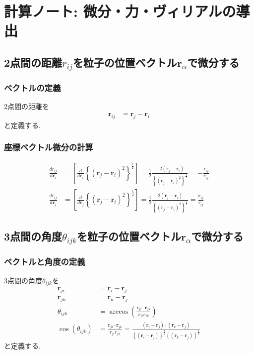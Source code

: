 \clearpage
\section{計算ノート: 微分・力・ヴィリアルの導出}
\subsection{2点間の距離$r_{ij}$を粒子の位置ベクトル$\bm{r}_{\alpha}$で微分する}
\subsubsection{ベクトルの定義}
2点間の距離を
\begin{align}
   \bm{r}_{ij}
&= \bm{r}_{j} - \bm{r}_{i}
\end{align}
と定義する.

\subsubsection{座標ベクトル微分の計算}
\begin{align}
\frac{d r_{ij}}{d \bm{r}_{i}}
&=
\left[
   \frac{d}{d \bm{r}_{i}}
   \left\{ (\bm{r}_{j} - \bm{r}_{i} )^{2} \right\}^{\frac{1}{2}}
\right]
=
\frac{1}{2}
\frac{ -2 (\bm{r}_{j} - \bm{r}_{i}) }
     { \left\{ ( \bm{r}_{j} - \bm{r}_{i} )^{2} \right\}^{\frac{1}{2}} }
=
-
\frac{\bm{r}_{ij}}{r_{ij}}
\label{Eq:dr_ij-dr_i}
\\
\frac{d r_{ij}}{d \bm{r}_{j}}
&=
\left[
   \frac{d}{d \bm{r}_{j}}
   \left\{ (\bm{r}_{j} - \bm{r}_{i} )^{2} \right\}^{\frac{1}{2}}
\right]
=
\frac{1}{2}
\frac{ 2 (\bm{r}_{j} - \bm{r}_{i}) }
     { \left\{ ( \bm{r}_{j} - \bm{r}_{i} )^{2} \right\}^{\frac{1}{2}} }
=
\frac{\bm{r}_{ij}}{r_{ij}}
\label{Eq:dr_ij-dr_j}
\end{align}

\subsection{3点間の角度$\theta_{ijk}$を粒子の位置ベクトル$\bm{r}_{\alpha}$で微分する}
\subsubsection{ベクトルと角度の定義}
3点間の角度$\theta_{ijk}$を
\begin{align}
   \bm{r}_{ji}
&= \bm{r}_{i} - \bm{r}_{j}
\\
   \bm{r}_{jk}
&= \bm{r}_{k} - \bm{r}_{j}
\\
   \theta_{ijk}
&= \arccos \left( \frac{\bm{r}_{ji} \cdot \bm{r}_{jk}}{r_{ji} r_{jk}} \right)
\\
   \cos(\theta_{ijk})
&= \frac{\bm{r}_{ji} \cdot \bm{r}_{jk}}{r_{ji} r_{jk}}
 = \frac{(\bm{r}_{i} - \bm{r}_{j}) \cdot (\bm{r}_{k} - \bm{r}_{j})}
        {\left\{(\bm{r}_{i} - \bm{r}_{j})\right\}^{\frac{1}{2}}
         \left\{(\bm{r}_{k} - \bm{r}_{j})\right\}^{\frac{1}{2}}}
\end{align}
と定義する.

